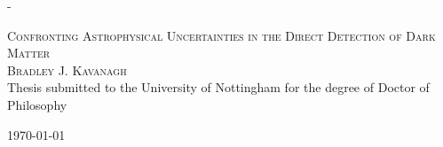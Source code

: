 \calccentering{\unitlength}                         %
\begin{adjustwidth*}{\unitlength}{-\unitlength}     %
    \begin{adjustwidth}{-1cm}{-1cm}                 %
      \begin{titlingpage}
      \begin{center}


      \textsc{\LARGE Confronting Astrophysical Uncertainties in the Direct Detection of Dark Matter}\\[1.5cm]

      \textsc{\Large Bradley J. Kavanagh}\\[0.5cm]


      Thesis submitted to the University of Nottingham for the degree of Doctor of Philosophy

      \vfill

      {\large \today}

      \end{center}
      \end{titlingpage}
    \end{adjustwidth}
\end{adjustwidth*}
